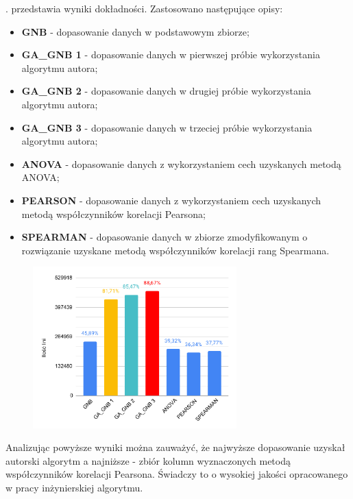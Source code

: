 . przedstawia wyniki dokładności. Zastosowano następujące opisy:
\begin{itemize}
    \item \textbf{GNB} - dopasowanie danych w podstawowym zbiorze;
    \item \textbf{GA\_GNB 1} - dopasowanie danych w pierwszej próbie wykorzystania algorytmu autora;
    \item \textbf{GA\_GNB 2} - dopasowanie danych w drugiej próbie wykorzystania algorytmu autora;
    \item \textbf{GA\_GNB 3} - dopasowanie danych w trzeciej próbie wykorzystania algorytmu autora;
    \item \textbf{ANOVA} - dopasowanie danych z wykorzystaniem cech uzyskanych metodą ANOVA;
    \item \textbf{PEARSON} - dopasowanie danych z wykorzystaniem cech uzyskanych metodą współczynników korelacji Pearsona;
    \item \textbf{SPEARMAN} - dopasowanie danych w zbiorze zmodyfikowanym o rozwiązanie uzyskane metodą  współczynników korelacji rang Spearmana.
\end{itemize}


\begin{figure}[H]
    \centering
    \includegraphics[width=0.7\textwidth]{images/Monday-WorkingHours_cmp}
    \label{fig:mond}
\end{figure}

Analizując powyższe wyniki można zauważyć, że najwyższe dopasowanie uzyskał autorski algorytm a najniższe - zbiór kolumn wyznaczonych metodą współczynników korelacji Pearsona. Świadczy to o wysokiej jakości opracowanego w pracy inżynierskiej algorytmu.

